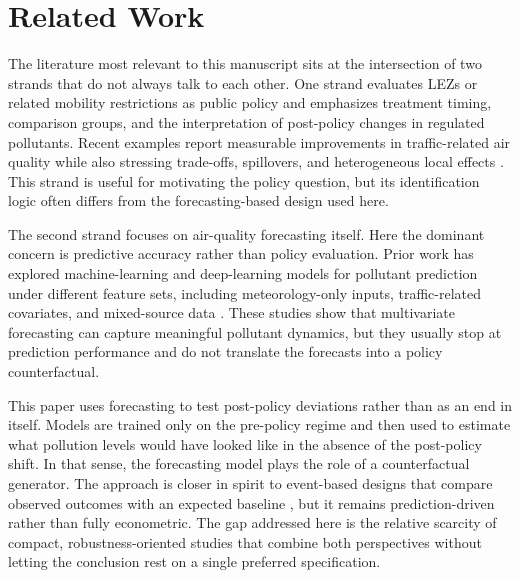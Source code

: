 \section{Related Work}\label{sec:related}

The literature most relevant to this manuscript sits at the intersection of two strands that do not always talk to each other. One strand evaluates LEZs or related mobility restrictions as public policy and emphasizes treatment timing, comparison groups, and the interpretation of post-policy changes in regulated pollutants. Recent examples report measurable improvements in traffic-related air quality while also stressing trade-offs, spillovers, and heterogeneous local effects \cite{PRIETORODRIGUEZ2022237,SARMIENTO2023105014}. This strand is useful for motivating the policy question, but its identification logic often differs from the forecasting-based design used here.

The second strand focuses on air-quality forecasting itself. Here the dominant concern is predictive accuracy rather than policy evaluation. Prior work has explored machine-learning and deep-learning models for pollutant prediction under different feature sets, including meteorology-only inputs, traffic-related covariates, and mixed-source data \cite{SAMAD2023119987,Rahman2024}. These studies show that multivariate forecasting can capture meaningful pollutant dynamics, but they usually stop at prediction performance and do not translate the forecasts into a policy counterfactual.

This paper uses forecasting to test post-policy deviations rather than as an end in itself. Models are trained only on the pre-policy regime and then used to estimate what pollution levels would have looked like in the absence of the post-policy shift. In that sense, the forecasting model plays the role of a counterfactual generator. The approach is closer in spirit to event-based designs that compare observed outcomes with an expected baseline \cite{Guo2021}, but it remains prediction-driven rather than fully econometric. The gap addressed here is the relative scarcity of compact, robustness-oriented studies that combine both perspectives without letting the conclusion rest on a single preferred specification.
